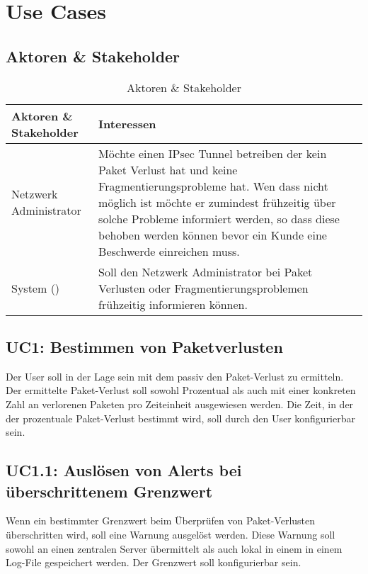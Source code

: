 \section{Use Cases}
\label{sec:Use Cases}

\subsection{Aktoren \& Stakeholder}

\begin{table}[H]
\begin{tabularx}{\textwidth}{l|>{\raggedright\arraybackslash}X} 
\textbf{Aktoren \& Stakeholder} & \textbf{Interessen} \\
\hline
Netzwerk Administrator & Möchte einen \ac{IPsec} Tunnel betreiben der kein Paket Verlust hat und keine Fragmentierungsprobleme hat. Wen dass nicht möglich ist möchte er zumindest frühzeitig über solche Probleme informiert werden, so dass diese behoben werden können bevor ein Kunde eine Beschwerde einreichen muss. \\
System (\tool{}) & Soll den Netzwerk Administrator bei Paket Verlusten oder Fragmentierungsproblemen frühzeitig informieren können. \\
\end{tabularx}
\caption{Aktoren \& Stakeholder}
\end{table}

\subsection{UC1: Bestimmen von Paketverlusten}
Der User soll in der Lage sein mit dem \tool{} passiv den Paket-Verlust zu ermitteln. Der ermittelte Paket-Verlust soll sowohl Prozentual als auch mit einer konkreten Zahl an verlorenen Paketen pro Zeiteinheit ausgewiesen werden. Die Zeit, in der der prozentuale Paket-Verlust bestimmt wird, soll durch den User konfigurierbar sein.

\subsection{UC1.1: Auslösen von Alerts bei überschrittenem Grenzwert}
Wenn ein bestimmter Grenzwert beim Überprüfen von Paket-Verlusten überschritten wird, soll eine Warnung ausgelöst werden. Diese Warnung soll sowohl an einen zentralen Server übermittelt als auch lokal in einem in einem Log-File gespeichert werden. Der Grenzwert soll konfigurierbar sein.

